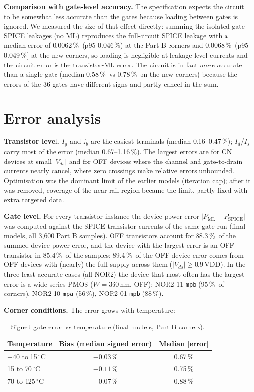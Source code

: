 \documentclass[11pt,a4paper]{article}
\newcommand{\code}[1]{\texttt{\small #1}}
\newcommand{\pct}{\,\%}
\begin{document}
\textbf{Comparison with gate-level accuracy.} The specification expects the circuit to be somewhat less
accurate than the gates because loading between gates is ignored. We measured the size of that effect
directly: summing the isolated-gate SPICE leakages (no ML) reproduces the full-circuit SPICE leakage with a
median error of 0.0062\pct\ (p95 0.046\pct) at the Part B corners and 0.0068\pct\ (p95 0.049\pct) at the new
corners, so loading is negligible at leakage-level currents and the circuit error is the transistor-ML error.
The circuit is in fact \emph{more} accurate than a single gate (median 0.58\pct\ vs 0.78\pct\ on the new
corners) because the errors of the 36 gates have different signs and partly cancel in the sum.

\section{Error analysis}
\textbf{Transistor level.} $I_g$ and $I_b$ are the easiest terminals (median 0.16--0.47\pct); $I_d$/$I_s$ carry
most of the error (median 0.67--1.16\pct). The largest errors are for ON devices at small $|V_{ds}|$ and for OFF
devices where the channel and gate-to-drain currents nearly cancel, where zero crossings make relative errors
unbounded. Optimisation was the dominant limit of the earlier models (iteration cap); after it was removed,
coverage of the near-rail region became the limit, partly fixed with extra targeted data.

\textbf{Gate level.} For every transistor instance the device-power error $|P_\text{ML} - P_\text{SPICE}|$ was
computed against the SPICE transistor currents of the same gate run (final models, all 3{,}600 Part B
samples). OFF transistors account for 88.3\pct\ of the summed device-power error, and the device with the
largest error is an OFF transistor in 85.4\pct\ of the samples; 89.4\pct\ of the OFF-device error comes from OFF
devices with (nearly) the full supply across them ($|V_{ds}| \ge 0.9\,$VDD). In the three least accurate cases
(all NOR2) the device that most often has the largest error is a wide series PMOS ($W = 360$\,nm, OFF): NOR2 11
\code{mpb} (95\pct\ of corners), NOR2 10 \code{mpa} (56\pct), NOR2 01 \code{mpb} (88\pct).

\textbf{Corner conditions.} The error grows with temperature:
\begin{table}[H]
\centering
\caption{Signed gate error vs temperature (final models, Part B corners).}
\begin{tabular}{lcc}
\toprule
Temperature & Bias (median signed error) & Median $|$error$|$ \\
\midrule
$-40$ to 15\,$^\circ$C & $-0.03$\pct & 0.67\pct \\
15 to 70\,$^\circ$C & $-0.11$\pct & 0.75\pct \\
70 to 125\,$^\circ$C & $-0.07$\pct & 0.88\pct \\
\bottomrule
\end{tabular}
\end{table}
\end{document}
